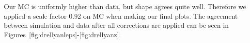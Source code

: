 Our MC is uniformly higher than data, but shape agrees quite well. Therefore we applied a scale factor 0.92 on MC when making our final plots. 
The agreement between simulation and data after all corrections are applied
can be seen in Figures~\ref{fig:drellyanleps}-\ref{fig:drellyanz}.



%
%
%
%
